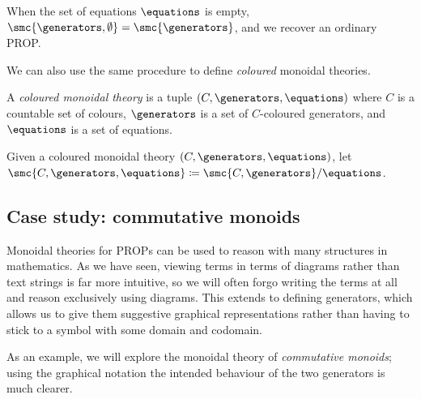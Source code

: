When the set of equations \(\equations\) is empty,
\(\smc{\generators, \emptyset} = \smc{\generators}\), and we recover an ordinary
PROP.

We can also use the same procedure to define \emph{coloured} monoidal theories.

\begin{definition}
    A \emph{coloured monoidal theory} is a tuple
    \((C, \generators, \equations)\) where \(C\) is a countable set of colours,
    \(\generators\) is a set of \(C\)-coloured generators, and \(\equations\)
    is a set of equations.
\end{definition}

\begin{definition}
    Given a coloured monoidal theory \((C, \generators, \equations)\), let
    \(\smc{C, \generators, \equations} \coloneqq \smc{C, \generators} / \equations\).
\end{definition}


\subsection{Case study: commutative monoids}

Monoidal theories for PROPs can be used to reason with many structures in
mathematics.
As we have seen, viewing terms in terms of diagrams rather than text strings is
far more intuitive, so we will often forgo writing the terms at all and reason
exclusively using diagrams.
This extends to defining generators, which allows us to give them suggestive
graphical representations rather than having to stick to a symbol with some
domain and codomain.

As an example, we will explore the monoidal theory of
\emph{commutative monoids}; using the graphical notation the intended behaviour
of the two generators is much clearer.

